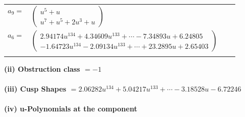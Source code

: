 \documentclass[1p]{elsarticle_modified}
\theoremstyle{definition}
\begin{document}
\begin{tabular}{m{7pt} m{180pt} m{7pt} m{180pt} }
\flushright $a_{9}=$&$\begin{pmatrix}u^5+u\\u^7+u^5+2 u^3+u\end{pmatrix}$ \\
\flushright $a_{6}=$&$\begin{pmatrix}2.94174 u^{134}+4.34609 u^{133}+\cdots-7.34893 u+6.24805\\-1.64723 u^{134}-2.09134 u^{133}+\cdots+23.2895 u+2.65403\end{pmatrix}$\\&\end{tabular}
\flushleft \textbf{(ii) Obstruction class $= -1$}\\~\\
\flushleft \textbf{(iii) Cusp Shapes $= 2.06282 u^{134}+5.04217 u^{133}+\cdots-3.18528 u-6.72246$}\\~\\
\newpage\renewcommand{\arraystretch}{1}
\flushleft \textbf{(iv) u-Polynomials at the component}\newline \\
\end{document}
